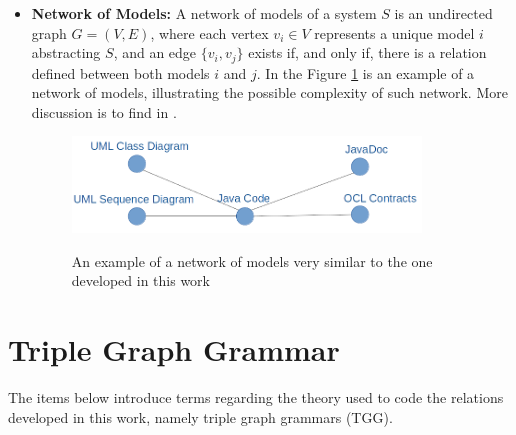 \documentclass[tuberlin,cic,tc,english,noabntcite,oneside]{iiufrgs}
\begin{document}
\begin{itemize}
	\item \textbf{Network of Models:} A network of models of a system $S$ is an undirected graph $G = (V,E)$, where each vertex $v_i \in V$ represents a unique model $i$ abstracting $S$, and an edge $\{v_i, v_j\}$ exists if, and only if, there is a relation defined between both models $i$ and $j$. In the Figure \ref{fig:network_example_01} is an example of a network of models, illustrating the possible complexity of such network. More discussion is to find in \citet{mens2006taxonomy}.

	\begin{figure}[H]
		\centering
	    \caption{An example of a network of models very similar to the one developed in this work}
	    \includegraphics[width=25em]{network_example_01}
	    \label{fig:network_example_01}
	\end{figure}
\end{itemize}
	
\section{Triple Graph Grammar}
The items below introduce terms regarding the theory used to code the relations developed in this work, namely triple graph grammars (TGG).
\end{document}
